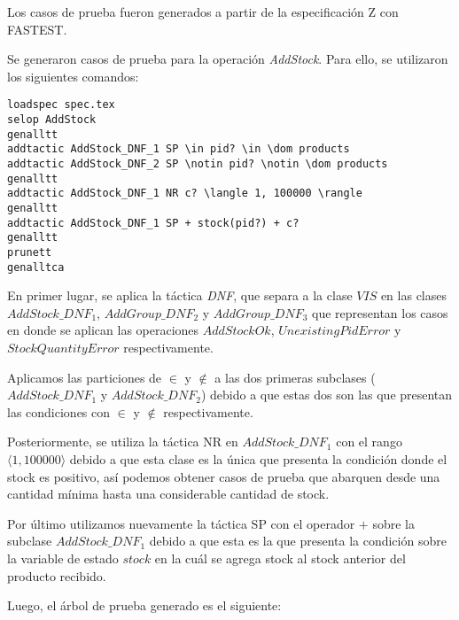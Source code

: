 \documentclass[fleqn,colorlinks,linkcolor=blue,citecolor=blue,urlcolor=blue]{article}
\begin{document}
Los casos de prueba fueron generados a partir de la especificación Z con FASTEST.

Se generaron casos de prueba para la operación \textit{AddStock}. Para ello, se utilizaron los siguientes comandos:

\begin{verbatim}
loadspec spec.tex
selop AddStock
genalltt
addtactic AddStock_DNF_1 SP \in pid? \in \dom products
addtactic AddStock_DNF_2 SP \notin pid? \notin \dom products
genalltt
addtactic AddStock_DNF_1 NR c? \langle 1, 100000 \rangle
genalltt
addtactic AddStock_DNF_1 SP + stock(pid?) + c?
genalltt
prunett
genalltca
\end{verbatim}

En primer lugar, se aplica la táctica \textit{DNF}, que separa a la clase $VIS$ en las clases $AddStock\_DNF_1$, $AddGroup\_DNF_2$ y $AddGroup\_DNF_3$ que representan los casos en donde se aplican las operaciones $AddStockOk$, $UnexistingPidError$ y $StockQuantityError$ respectivamente.

Aplicamos las particiones de $\in$ y $\notin$ a las dos primeras subclases ($AddStock\_DNF_1$ y $AddStock\_DNF_2$) debido a que estas dos son las que presentan las condiciones con $\in$ y $\notin$ respectivamente. 

Posteriormente, se utiliza la táctica NR en $AddStock\_DNF_1$ con el rango $\langle 1, 100000 \rangle$ debido a que esta clase es la única que presenta la condición donde el stock es positivo, así podemos obtener casos de prueba que abarquen desde una cantidad mínima hasta una considerable cantidad de stock. 

Por último utilizamos nuevamente la táctica SP con el operador $+$ sobre la subclase $AddStock\_DNF_1$ debido a que esta es la que presenta la condición sobre la variable de estado $stock$ en la cuál se agrega stock al stock anterior del producto recibido.

Luego, el árbol de prueba generado es el siguiente: 
\end{document}
